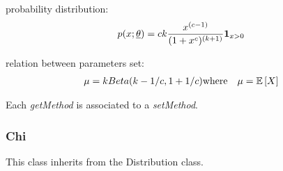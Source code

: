 \begin{description}
\begin{description}
\end{description}

\item[Details:]  \rule{0pt}{1em}
\begin{description}
\item probability distribution:
\begin{equation}
p(x;{\underline{\theta}}) = ck\frac{x^{(c-1)}}{(1+x^c)^{(k+1)}} \mathbf{1}_{x >0}
\end{equation}
\item relation between parameters set:
\begin{eqnarray*}
\mu  =   kBeta(k-1/c, 1+1/c)                                              & \mbox{where}& \mu ={\mathbb E}\left[ X \right]
\end{eqnarray*}

\end{description}
\bigskip

\item[Links:]  \rule{0pt}{1em}
\end{description}


Each  \textit{getMethod}  is associated to a \textit{setMethod}.

\newpage
\subsubsection{Chi}

This class inherits from the Distribution class.

